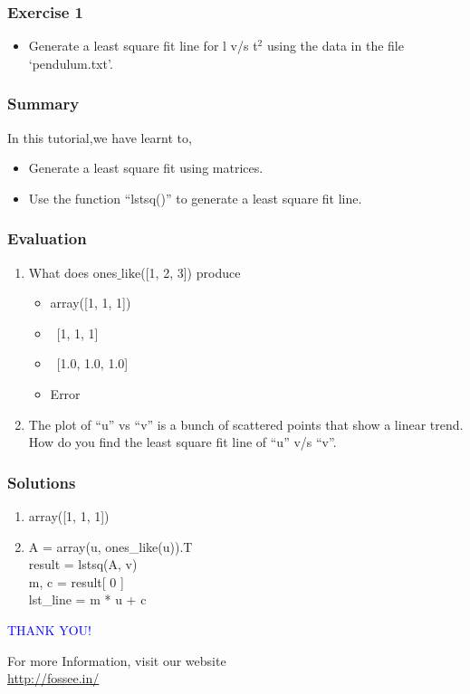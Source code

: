 \documentclass[presentation]{beamer}
\begin{document}
\begin{frame}
\frametitle{Exercise 1}
\label{sec-4}


\begin{itemize}
\item Generate a least square fit line for l v/s t$^2$ using the data in the file
    `pendulum.txt'.
\end{itemize}
\end{frame}
\begin{frame}
\frametitle{Summary}
\label{sec-5}

  In this tutorial,we have learnt to,


\begin{itemize}
\item Generate a least square fit using matrices.
\item Use the function ``lstsq()'' to generate a least square fit line.
\end{itemize}
\end{frame}
\begin{frame}
\frametitle{Evaluation}
\label{sec-6}


\begin{enumerate}
\item What does ones$\_{\mathrm{like}}$([1, 2, 3]) produce
\begin{itemize}
\item array([1, 1, 1])
\item ~[1, 1, 1]~
\item ~[1.0, 1.0, 1.0]~
\item Error
\end{itemize}
\vspace{10pt}
\item The plot of ``u'' vs ``v'' is a bunch of scattered points that show a
     linear trend. How do you find the least square fit line of ``u'' v/s ``v''.
\end{enumerate}
\end{frame}
\begin{frame}
\frametitle{Solutions}
\label{sec-7}


\begin{enumerate}
\item array([1, 1, 1])
\vspace{15pt}
\item A = array(u, ones\_like(u)).T\\
     result = lstsq(A, v)\\
     m, c = result[ 0 ]\\
     lst\_line = m * u + c
\end{enumerate}
\end{frame}
\begin{frame}

  \begin{block}{}
  \begin{center}
  \textcolor{blue}{\Large THANK YOU!} 
  \end{center}
  \end{block}
\begin{block}{}
  \begin{center}
    For more Information, visit our website\\
    \url{http://fossee.in/}
  \end{center}  
  \end{block}
\end{frame}
\end{document}
